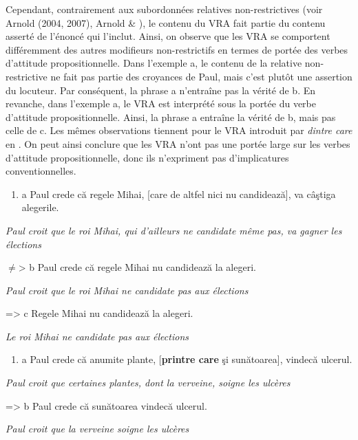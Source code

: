Cependant, contrairement aux subordonnées relatives non-restrictives (voir Arnold (2004, 2007), Arnold \& \citet{Borsley2008}), le contenu du VRA fait partie du contenu asserté de l'énoncé qui l'inclut. Ainsi, on observe que les VRA se comportent différemment des autres modifieurs non-restrictifs en termes de portée des verbes d'attitude propositionnelle. Dans l'exemple a, le contenu de la relative non-restrictive ne fait pas partie des croyances de Paul, mais c'est plutôt une assertion du locuteur. Par conséquent, la phrase a n'entraîne pas la vérité de b. En revanche, dans l'exemple a, le VRA est interprété sous la portée du verbe d'attitude propositionnelle. Ainsi, la phrase a entraîne la vérité de b, mais pas celle de c. Les mêmes observations tiennent pour le VRA introduit par \textit{dintre care} en . On peut ainsi conclure que les VRA n'ont pas une portée large sur les verbes d'attitude propositionnelle, donc ils n'expriment pas d'implicatures conventionnelles.


\begin{enumerate}
\item \label{bkm:Ref293686362}a  Paul crede că regele Mihai, [care de altfel nici nu candidează], va câştiga alegerile. 


\end{enumerate}
{\itshape
Paul croit que le roi Mihai, qui d'ailleurs ne candidate même pas, va gagner les élections}

${\neq}${\textgreater}  b  Paul crede că regele Mihai nu candidează la alegeri.

{\itshape
Paul croit que le roi Mihai ne candidate pas aux élections}

={\textgreater}  c  Regele Mihai nu candidează la alegeri.

{\itshape
Le roi Mihai ne candidate pas aux élections}


\begin{enumerate}
\item \label{bkm:Ref293686484}a  Paul crede că anumite plante, [\textbf{printre care} şi sunătoarea], vindecă ulcerul. 


\end{enumerate}
{\itshape
Paul croit que certaines plantes, dont la verveine, soigne les ulcères}

={\textgreater}  b  Paul crede că sunătoarea vindecă ulcerul.

{\itshape
Paul croit que la verveine soigne les ulcères}

